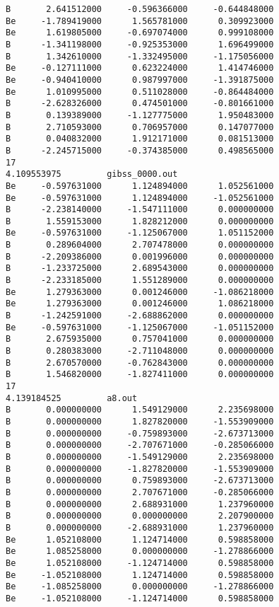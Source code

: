 \documentclass[prb,aps,preprint,showkeys,showpacs]{revtex4}
\begin{document}
\begin{verbatim}
B       2.641512000     -0.596366000     -0.644848000
Be     -1.789419000      1.565781000      0.309923000
Be      1.619805000     -0.697074000      0.999108000
B      -1.341198000     -0.925353000      1.696499000
B       1.342610000     -1.332495000     -1.175056000
Be     -0.127111000      0.623224000      1.414746000
Be     -0.940410000      0.987997000     -1.391875000
Be      1.010995000      0.511028000     -0.864484000
B      -2.628326000      0.474501000     -0.801661000
B       0.139389000     -1.127775000      1.950483000
B       2.710593000      0.706957000      0.147077000
B       0.040832000      1.912171000      0.081513000
B      -2.245715000     -0.374385000      0.498565000
17    
4.109553975         gibss_0000.out
Be     -0.597631000      1.124894000      1.052561000
Be     -0.597631000      1.124894000     -1.052561000
B      -2.238140000     -1.547111000      0.000000000
B       1.559153000      1.828212000      0.000000000
Be     -0.597631000     -1.125067000      1.051152000
B       0.289604000      2.707478000      0.000000000
B      -2.209386000      0.001996000      0.000000000
B      -1.233725000      2.689543000      0.000000000
B      -2.233185000      1.551289000      0.000000000
Be      1.279363000      0.001246000     -1.086218000
Be      1.279363000      0.001246000      1.086218000
B      -1.242591000     -2.688862000      0.000000000
Be     -0.597631000     -1.125067000     -1.051152000
B       2.675935000      0.757041000      0.000000000
B       0.280383000     -2.711048000      0.000000000
B       2.670570000     -0.762843000      0.000000000
B       1.546820000     -1.827411000      0.000000000
17    
4.139184525         a8.out
B       0.000000000      1.549129000      2.235698000
B       0.000000000      1.827820000     -1.553909000
B       0.000000000     -0.759893000     -2.673713000
B       0.000000000     -2.707671000     -0.285066000
B       0.000000000     -1.549129000      2.235698000
B       0.000000000     -1.827820000     -1.553909000
B       0.000000000      0.759893000     -2.673713000
B       0.000000000      2.707671000     -0.285066000
B       0.000000000      2.688931000      1.237960000
B       0.000000000      0.000000000      2.207900000
B       0.000000000     -2.688931000      1.237960000
Be      1.052108000      1.124714000      0.598858000
Be      1.085258000      0.000000000     -1.278866000
Be      1.052108000     -1.124714000      0.598858000
Be     -1.052108000      1.124714000      0.598858000
Be     -1.085258000      0.000000000     -1.278866000
Be     -1.052108000     -1.124714000      0.598858000

\end{verbatim}
\end{document}
